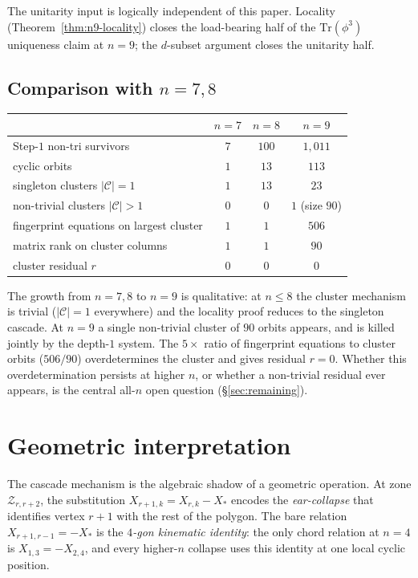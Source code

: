 \documentclass[11pt]{article}
\theoremstyle{definition}
\begin{document}
The unitarity input is logically independent of this paper.
Locality (Theorem~\ref{thm:n9-locality}) closes the load-bearing
half of the $\mathrm{Tr}(\phi^3)$ uniqueness claim at $n=9$;
the $d$-subset argument closes the unitarity half.

\subsection{Comparison with $n=7,8$}\label{subsec:compare}

\begin{center}
\begin{tabular}{lccc}
\toprule
& $n=7$ & $n=8$ & $n=9$ \\
\midrule
Step-$1$ non-tri survivors & $7$ & $100$ & $1{,}011$ \\
\quad cyclic orbits & $1$ & $13$ & $113$ \\
singleton clusters $|\mathcal C|=1$ & $1$ & $13$ & $23$ \\
non-trivial clusters $|\mathcal C|>1$ & $0$ & $0$ & $1$ (size $90$) \\
fingerprint equations on largest cluster & $1$ & $1$ & $506$ \\
matrix rank on cluster columns & $1$ & $1$ & $90$ \\
cluster residual $r$ & $0$ & $0$ & $0$ \\
\bottomrule
\end{tabular}
\end{center}

The growth from $n=7,8$ to $n=9$ is qualitative: at $n\le 8$ the
cluster mechanism is trivial ($|\mathcal C|=1$ everywhere) and the
locality proof reduces to the singleton cascade. At $n=9$ a single
non-trivial cluster of $90$ orbits appears, and is killed jointly
by the depth-$1$ system. The $5\!\times$ ratio of fingerprint
equations to cluster orbits ($506/90$) overdetermines the cluster
and gives residual $r=0$. Whether this overdetermination persists
at higher $n$, or whether a non-trivial residual ever appears,
is the central all-$n$ open question (\S\ref{sec:remaining}).

\section{Geometric interpretation}\label{sec:geom}

The cascade mechanism is the algebraic shadow of a geometric
operation. At zone $\mathcal Z_{r,r+2}$, the substitution
$X_{r+1,k}=X_{r,k}-X_*$ encodes the \emph{ear-collapse} that
identifies vertex $r{+}1$ with the rest of the polygon. The bare
relation $X_{r+1,r-1}=-X_*$ is the \emph{$4$-gon kinematic
identity}: the only chord relation at $n=4$ is $X_{1,3}=-X_{2,4}$,
and every higher-$n$ collapse uses this identity at one local
cyclic position.
\end{document}
